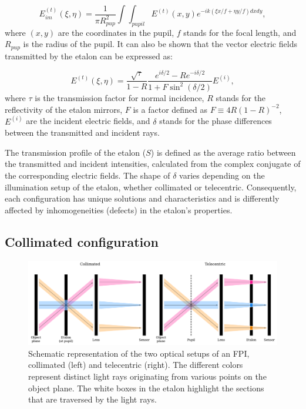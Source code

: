 \begin{equation}
  E_{im} ^{(t)}(\xi, \eta) = \frac{1}{\pi R_{pup} ^2} \int \int _ {pupil} E^{(t)}(x, y)e ^{-ik( \xi x / f + \eta y / f)dx dy},
  \label{eq_etalon_theory: electric_image_plane}
\end{equation}
where $(x, y)$ are the coordinates in the pupil, $f$ stands for the focal length, and $R_{pup}$ is the radius of the pupil.  It can also be shown that the vector electric fields transmitted by the etalon can be expressed as:

\begin{equation}
  E ^{(t)}(\xi, \eta) = \frac{\sqrt{\tau}}{1 - R}\frac{e ^{i\delta / 2} - R e ^{ -i\delta / 2}}{1 + F \sin ^2 (\delta / 2)}E ^{(i)},
  \label{eq_etalon_theory: electric_transmitted}
\end{equation}
where $\tau$ is the transmission factor for normal incidence, $R$ stands for the reflectivity of the etalon mirrors, $F$ is a factor defined as $F \equiv 4R (1 - R )^{-2}$, $E^{(i)}$ are the incident electric fields, and $\delta$ stands for the phase differences between the transmitted and incident rays. 

The transmission profile of the etalon ($S$) is defined as the average ratio between the transmitted and incident intensities, calculated from the complex conjugate of the corresponding electric fields. The shape of $\delta$ varies depending on the illumination setup of the etalon, whether collimated or telecentric. Consequently, each configuration has unique solutions and characteristics and is differently affected by inhomogeneities (defects) in the etalon's properties.

\subsection{\label{susec_etalon_theory: collimated}Collimated configuration}

\begin{figure}
  \centering
  \includegraphics[width = \textwidth]{figures/EtalonChallenges/EtalonConfigurations.pdf}
  \caption{Schematic representation of the two optical setups of an FPI, collimated (left) and telecentric (right). The different colors represent distinct light rays originating from various points on the object plane. The white boxes in the etalon highlight the sections that are traversed by the light rays.
  } \label{fig_etalon_theory: Etalon configurations}
\end{figure}

